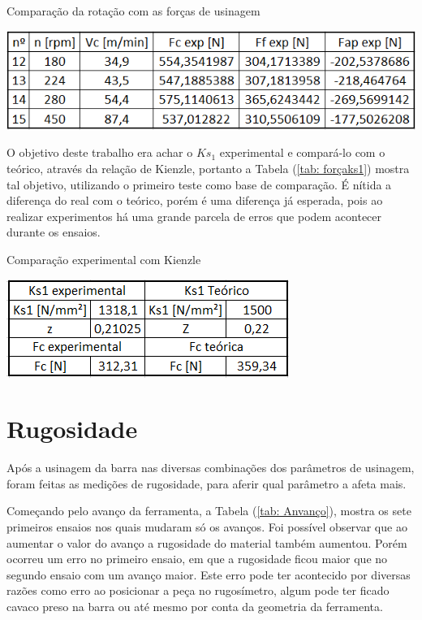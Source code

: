 \documentclass[deposito, acronym, symbols]{fei}
\begin{document}
\begin{table}[!htb]
 \centering
    \caption{Comparação da rotação com as forças de usinagem}
    \includegraphics[width=0.7\linewidth]{Imagens/nvcxforças.png}
    \label{tab: rotação}
 \end{table}

O objetivo deste trabalho era achar o $Ks_1$ experimental e compará-lo com o teórico, através da relação de Kienzle, portanto a Tabela (\ref{tab: forçaks1}) mostra tal objetivo, utilizando o primeiro teste como base de comparação. É nítida a diferença do real com o teórico, porém é uma diferença já esperada, pois ao realizar experimentos há uma grande parcela de erros que podem acontecer durante os ensaios.

\begin{table}[!htb]
 \centering
    \caption{Comparação experimental com Kienzle}
    \includegraphics[width=0.5\linewidth]{Imagens/ks1txks1k.png}
    \label{tab: forçaks1}
 \end{table}
 
\section{Rugosidade}
Após a usinagem da barra nas diversas combinações dos parâmetros de usinagem, foram feitas as medições de rugosidade, para aferir qual parâmetro a afeta mais.

Começando pelo avanço da ferramenta, a Tabela (\ref{tab: Anvanço}), mostra os sete primeiros ensaios nos quais mudaram só os avanços. Foi possível observar que ao aumentar o valor do avanço a rugosidade do material também aumentou. Porém ocorreu um erro no primeiro ensaio, em que a rugosidade ficou maior que no segundo ensaio com um avanço maior. Este erro pode ter acontecido por diversas razões como erro ao posicionar a peça no rugosímetro, algum pode ter ficado cavaco preso na barra ou até mesmo por conta da geometria da ferramenta. 
\end{document}
